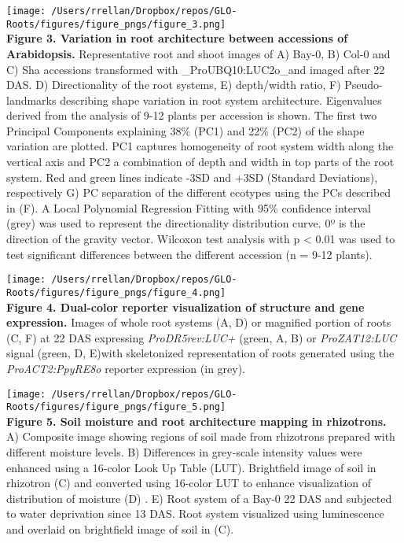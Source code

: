 \documentclass[]{article}
\begin{document}
\texttt{[image: /Users/rrellan/Dropbox/repos/GLO-Roots/figures/figure\_pngs/figure\_3.png]}\\\textbf{Figure
3. Variation in root architecture between accessions of Arabidopsis.}
Representative root and shoot images of A) Bay-0, B) Col-0 and C) Sha
accessions transformed with \_ProUBQ10:LUC2o\_and imaged after 22 DAS.
D) Directionality of the root systems, E) depth/width ratio, F)
Pseudo-landmarks describing shape variation in root system architecture.
Eigenvalues derived from the analysis of 9-12 plants per accession is
shown. The first two Principal Components explaining 38\% (PC1) and 22\%
(PC2) of the shape variation are plotted. PC1 captures homogeneity of
root system width along the vertical axis and PC2 a combination of depth
and width in top parts of the root system. Red and green lines indicate
-3SD and +3SD (Standard Deviations), respectively G) PC separation of
the different ecotypes using the PCs described in (F). A Local
Polynomial Regression Fitting with 95\% confidence interval (grey) was
used to represent the directionality distribution curve. 0º is the
direction of the gravity vector. Wilcoxon test analysis with p
\textless{} 0.01 was used to test significant differences between the
different accession (n = 9-12 plants).



\texttt{[image: /Users/rrellan/Dropbox/repos/GLO-Roots/figures/figure\_pngs/figure\_4.png]}\\\textbf{Figure
4. Dual-color reporter visualization of structure and gene expression.}
Images of whole root systems (A, D) or magnified portion of roots (C, F)
at 22 DAS expressing \emph{ProDR5rev:LUC+} (green, A, B) or
\emph{ProZAT12:LUC} signal (green, D, E)with skeletonized representation
of roots generated using the \emph{ProACT2:PpyRE8o} reporter expression
(in grey).



\texttt{[image: /Users/rrellan/Dropbox/repos/GLO-Roots/figures/figure\_pngs/figure\_5.png]}\\\textbf{Figure
5. Soil moisture and root architecture mapping in rhizotrons.} A)
Composite image showing regions of soil made from rhizotrons prepared
with different moisture levels. B) Differences in grey-scale intensity
values were enhanced using a 16-color Look Up Table (LUT). Brightfield
image of soil in rhizotron (C) and converted using 16-color LUT to
enhance visualization of distribution of moisture (D) . E) Root system
of a Bay-0 22 DAS and subjected to water deprivation since 13 DAS. Root
system visualized using luminescence and overlaid on brightfield image
of soil in (C).
\end{document}

